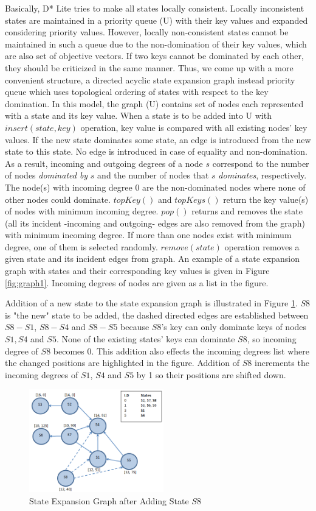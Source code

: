 \documentclass[10pt, a4paper, conference, compsocconf]{IEEEtran}
\begin{document}
Basically, D* Lite tries to make all states locally consistent. Locally inconsistent states are maintained in  a priority queue (U) with their key values and expanded considering priority values. However, locally non-consistent states cannot be maintained in such a queue due to the non-domination of their key values, which are also set of objective vectors. If two keys cannot be dominated by each other, they should be criticized in the same manner. Thus, we come up with a more convenient structure, a directed acyclic state expansion graph instead priority queue which uses topological ordering of states with respect to the key domination. In this model, the graph (U) contains set of nodes each represented with a state and its key value. When a state is to be added into U with $insert(state, key)$ operation, key value is compared with all existing nodes' key values. If the new state dominates some state, an edge is introduced from the new state to this state. No edge is introduced in case of equality and non-domination. As a result, incoming and outgoing degrees of a node $s$ correspond to the number of nodes \textit{dominated by} $s$  and the number of nodes that $s$ \textit{dominates}, respectively. The node(s) with incoming degree 0 are the non-dominated nodes where none of other nodes could dominate. $topKey()$ and $topKeys()$ return the key value(s) of nodes with minimum incoming degree. $pop()$ returns and removes the state (all its incident -incoming and outgoing- edges are also removed from the graph) with minimum incoming degree. If more than one nodes exist with minimum degree, one of them is selected randomly. $remove(state)$ operation removes a given state and its incident edges from graph. An example of a state expansion graph with states and their corresponding key values is given in Figure \ref{fig:graph1}. Incoming degrees of nodes are given as a list in the figure.

Addition of a new state to the state expansion graph is illustrated in Figure \ref{fig:graph2}.  $S8$ is  "the new" state to be added, the dashed directed edges are established between $S8-S1$, $S8-S4$ and $S8-S5$ because $S8$'s key can only dominate keys of nodes $S1, S4$ and $S5$. None of the existing states' keys can dominate $S8$, so incoming degree of $S8$ becomes 0. This addition also effects the incoming degrees list where the changed positions are highlighted in the figure. Addition of $S8$ increments the incoming degrees of $S1$, $S4$ and $S5$ by 1 so their positions are shifted down.

\begin{figure}
\centering
\includegraphics[width=2.3in]{graph2v2}
\caption{State Expansion Graph after Adding State $S8$}
\label{fig:graph2}
\end{figure}
\end{document}

